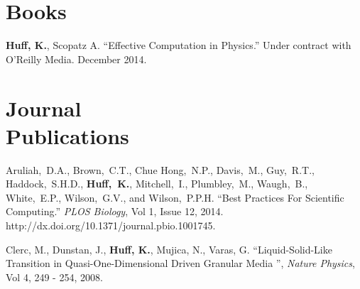 \documentclass[margin,line]{resume}
\begin{document}
\begin{resume}
    \section{\mysidestyle Books}
      \begin{bibenum}
      \item \textbf{Huff, K.}, Scopatz A. ``Effective Computation in Physics.'' Under contract with O'Reilly Media. December 2014. 
      \end{bibenum}
    \section{\mysidestyle Journal\\Publications}
      \begin{bibenum}
       \item Aruliah,~D.A., Brown,~C.T., Chue Hong,~N.P., Davis,~M., Guy,~R.T., 
          Haddock,~S.H.D., \textbf{Huff,~K.}, Mitchell,~I., Plumbley,~M., Waugh,~B., 
          White,~E.P., Wilson,~G.V., and Wilson,~P.P.H.  ``Best Practices For 
          Scientific Computing.'' \textsl{PLOS Biology}, Vol 1, Issue 12, 
          2014.\\ http://dx.doi.org/10.1371/journal.pbio.1001745.
       \item Clerc, M., Dunstan, J., \textbf{Huff, K.}, Mujica, N., Varas, G. 
          ``Liquid-Solid-Like Transition in Quasi-One-Dimensional Driven 
          Granular Media '',  \textsl{Nature Physics}, Vol 4, 249 - 254, 2008.
      \end{bibenum}

\end{resume}
\end{document}

